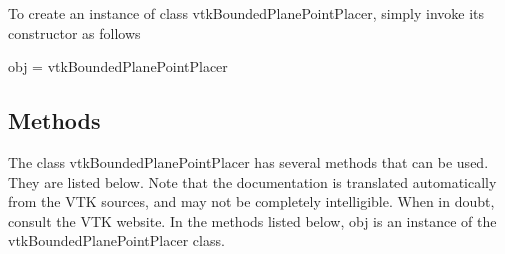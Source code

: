 To create an instance of class vtk\-Bounded\-Plane\-Point\-Placer, simply invoke its constructor as follows \begin{DoxyVerb}  obj = vtkBoundedPlanePointPlacer
\end{DoxyVerb}
 \hypertarget{vtkwidgets_vtkxyplotwidget_Methods}{}\subsection{Methods}\label{vtkwidgets_vtkxyplotwidget_Methods}
The class vtk\-Bounded\-Plane\-Point\-Placer has several methods that can be used. They are listed below. Note that the documentation is translated automatically from the V\-T\-K sources, and may not be completely intelligible. When in doubt, consult the V\-T\-K website. In the methods listed below, {\ttfamily obj} is an instance of the vtk\-Bounded\-Plane\-Point\-Placer class. 
